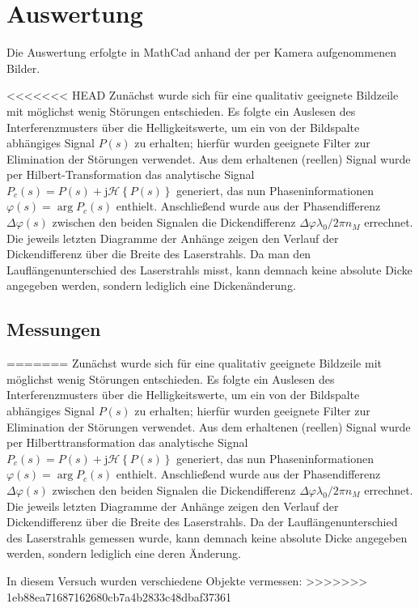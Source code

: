 \section{Auswertung}

Die Auswertung erfolgte in MathCad anhand der per Kamera aufgenommenen Bilder.

<<<<<<< HEAD
Zunächst wurde sich für eine qualitativ geeignete Bildzeile mit möglichst wenig Störungen entschieden. Es folgte ein Auslesen des Interferenzmusters über die Helligkeitswerte, um ein von der Bildspalte abhängiges Signal $P(s)$ zu erhalten; hierfür wurden geeignete Filter zur Elimination der Störungen verwendet. Aus dem erhaltenen (reellen) Signal wurde per Hilbert-Transformation das analytische Signal $P_c(s) = P(s) + \mathrm j \mathcal H\left\lbrace P(s) \right\rbrace$ generiert, das nun Phaseninformationen $\varphi(s)=\arg P_c(s)$ enthielt. Anschließend wurde aus der Phasendifferenz $\Delta\varphi(s)$  zwischen den beiden Signalen die Dickendifferenz $\Delta\varphi\lambda_0 / 2\pi n_M$ errechnet. Die jeweils letzten Diagramme der Anhänge zeigen den Verlauf der Dickendifferenz über die Breite des Laserstrahls. Da man den Lauflängenunterschied des Laserstrahls misst, kann demnach keine absolute Dicke angegeben werden, sondern lediglich eine Dickenänderung.

\subsection{Messungen}
=======
Zunächst wurde sich für eine qualitativ geeignete Bildzeile mit möglichst wenig Störungen entschieden. Es folgte ein Auslesen des Interferenzmusters über die Helligkeitswerte, um ein von der Bildspalte abhängiges Signal $P(s)$ zu erhalten; hierfür wurden geeignete Filter zur Elimination der Störungen verwendet. Aus dem erhaltenen (reellen) Signal wurde per Hilberttransformation das analytische Signal $P_c(s) = P(s) + \mathrm j \mathcal H\left\lbrace P(s) \right\rbrace$ generiert, das nun Phaseninformationen $\varphi(s)=\arg P_c(s)$ enthielt. Anschließend wurde aus der Phasendifferenz $\Delta\varphi(s)$  zwischen den beiden Signalen die Dickendifferenz $\Delta\varphi\lambda_0 / 2\pi n_M$ errechnet. Die jeweils letzten Diagramme der Anhänge zeigen den Verlauf der Dickendifferenz über die Breite des Laserstrahls. Da der Lauflängenunterschied des Laserstrahls gemessen wurde, kann demnach keine absolute Dicke angegeben werden, sondern lediglich eine deren Änderung.

In diesem Versuch wurden verschiedene Objekte vermessen:
>>>>>>> 1eb88ea71687162680cb7a4b2833c48dbaf37361

